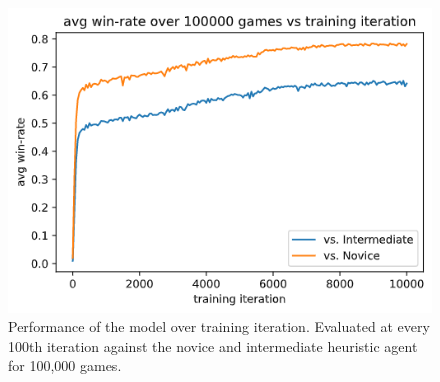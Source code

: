 \documentclass[../main.tex]{subfiles}
\begin{document}
\begin{figure}
    \centering
    \includegraphics[width=\textwidth,keepaspectratio]{images/rules_vs_models.png}
    \caption{Performance of the model over training iteration. Evaluated at every 100th iteration against the novice and intermediate heuristic agent for 100,000 games.}
    \label{fig:model_vs_rules}
\end{figure}


\end{document}
